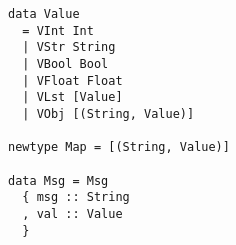 \begin{verbatim}
data Value
  = VInt Int
  | VStr String
  | VBool Bool
  | VFloat Float
  | VLst [Value]
  | VObj [(String, Value)]

newtype Map = [(String, Value)]

data Msg = Msg
  { msg :: String
  , val :: Value
  }
\end{verbatim}
